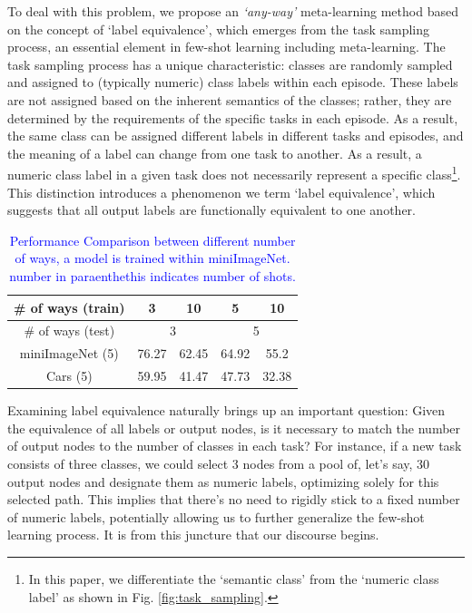 \documentclass[letterpaper]{article} %
\newcommand{\jh}[1]{\textcolor{blue}{#1}}
\begin{document}
To deal with this problem, we propose an \textit{‘any-way’} meta-learning method based on the concept of ‘label equivalence’, which emerges from the task sampling process, an essential element in few-shot learning including meta-learning.
The task sampling process has a unique characteristic: classes are randomly sampled and assigned to (typically numeric) class labels within each episode. These labels are not assigned based on the inherent semantics of the classes; rather, they are determined by the requirements of the specific tasks in each episode. As a result, the same class can be assigned different labels in different tasks and episodes, and the meaning of a label can change from one task to another. As a result, a numeric class label in a given task does not necessarily represent a specific class\footnote{In this paper, we differentiate the `semantic class' from the `numeric class label' as shown in Fig. \ref{fig:task_sampling}.}. This distinction introduces a phenomenon we term `label equivalence', which suggests that all output labels are functionally equivalent to one another.

\begin{table}[t]
\caption{\jh{Performance Comparison between different number of ways, a model is trained within miniImageNet. number in paraenthethis indicates number of shots.}}
\centering
\begin{tabular}{c|cc|cc}
\hline
\# of ways (train)    & \multicolumn{1}{c|}{3} & 10    & \multicolumn{1}{c|}{5} & 10    \\ \hline
\# of ways (test)     & \multicolumn{2}{c|}{3} & \multicolumn{2}{c}{5} \\ \hline \hline
miniImageNet (5) & 76.27      & 62.45     & 64.92     & 55.2      \\ \hline
Cars (5)        & 59.95      & 41.47     & 47.73     & 32.38    \\ \hline
\end{tabular}
\label{table:intuition}
\end{table}

Examining label equivalence naturally brings up an important question: Given the equivalence of all labels or output nodes,
is it necessary 
to match the number of output nodes to the number of classes in each task? For instance, if a new task consists of three classes, we could select 3 nodes from a pool of, let's say,  
30 output nodes and designate them as numeric labels, optimizing solely for this selected path. This implies that there's no need to rigidly stick to a fixed number of numeric labels, potentially allowing us to further generalize the few-shot learning process. It is from this juncture that our discourse begins.
\end{document}
